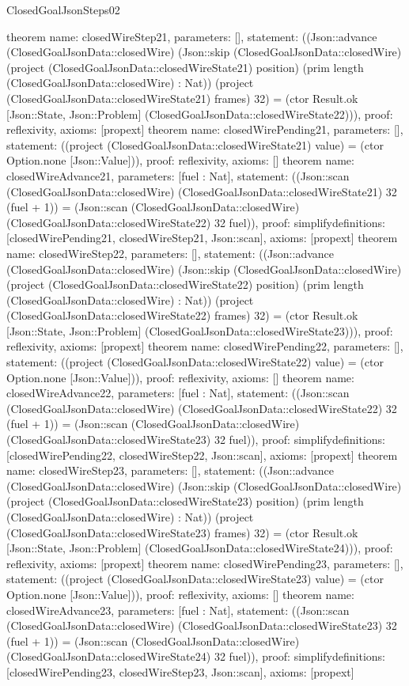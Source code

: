 \begin{lexlean}{ClosedGoalJsonSteps02}
\begin{semanticmodule}
{}
theorem{
 name: closedWireStep21, parameters: [],
 statement: ((Json::advance (ClosedGoalJsonData::closedWire) (Json::skip (ClosedGoalJsonData::closedWire) (project (ClosedGoalJsonData::closedWireState21) position) (prim length (ClosedGoalJsonData::closedWire) : Nat)) (project (ClosedGoalJsonData::closedWireState21) frames) 32) = (ctor Result.ok [Json::State, Json::Problem] (ClosedGoalJsonData::closedWireState22))), proof: reflexivity{}, axioms: [propext]
}
theorem{
 name: closedWirePending21, parameters: [],
 statement: ((project (ClosedGoalJsonData::closedWireState21) value) = (ctor Option.none [Json::Value])), proof: reflexivity{}, axioms: []
}
theorem{
 name: closedWireAdvance21, parameters: [fuel : Nat],
 statement: ((Json::scan (ClosedGoalJsonData::closedWire) (ClosedGoalJsonData::closedWireState21) 32 (fuel + 1)) = (Json::scan (ClosedGoalJsonData::closedWire) (ClosedGoalJsonData::closedWireState22) 32 fuel)), proof: simplify{definitions: [closedWirePending21, closedWireStep21, Json::scan]}, axioms: [propext]
}
theorem{
 name: closedWireStep22, parameters: [],
 statement: ((Json::advance (ClosedGoalJsonData::closedWire) (Json::skip (ClosedGoalJsonData::closedWire) (project (ClosedGoalJsonData::closedWireState22) position) (prim length (ClosedGoalJsonData::closedWire) : Nat)) (project (ClosedGoalJsonData::closedWireState22) frames) 32) = (ctor Result.ok [Json::State, Json::Problem] (ClosedGoalJsonData::closedWireState23))), proof: reflexivity{}, axioms: [propext]
}
theorem{
 name: closedWirePending22, parameters: [],
 statement: ((project (ClosedGoalJsonData::closedWireState22) value) = (ctor Option.none [Json::Value])), proof: reflexivity{}, axioms: []
}
theorem{
 name: closedWireAdvance22, parameters: [fuel : Nat],
 statement: ((Json::scan (ClosedGoalJsonData::closedWire) (ClosedGoalJsonData::closedWireState22) 32 (fuel + 1)) = (Json::scan (ClosedGoalJsonData::closedWire) (ClosedGoalJsonData::closedWireState23) 32 fuel)), proof: simplify{definitions: [closedWirePending22, closedWireStep22, Json::scan]}, axioms: [propext]
}
theorem{
 name: closedWireStep23, parameters: [],
 statement: ((Json::advance (ClosedGoalJsonData::closedWire) (Json::skip (ClosedGoalJsonData::closedWire) (project (ClosedGoalJsonData::closedWireState23) position) (prim length (ClosedGoalJsonData::closedWire) : Nat)) (project (ClosedGoalJsonData::closedWireState23) frames) 32) = (ctor Result.ok [Json::State, Json::Problem] (ClosedGoalJsonData::closedWireState24))), proof: reflexivity{}, axioms: [propext]
}
theorem{
 name: closedWirePending23, parameters: [],
 statement: ((project (ClosedGoalJsonData::closedWireState23) value) = (ctor Option.none [Json::Value])), proof: reflexivity{}, axioms: []
}
theorem{
 name: closedWireAdvance23, parameters: [fuel : Nat],
 statement: ((Json::scan (ClosedGoalJsonData::closedWire) (ClosedGoalJsonData::closedWireState23) 32 (fuel + 1)) = (Json::scan (ClosedGoalJsonData::closedWire) (ClosedGoalJsonData::closedWireState24) 32 fuel)), proof: simplify{definitions: [closedWirePending23, closedWireStep23, Json::scan]}, axioms: [propext]
}
\end{semanticmodule}
\end{lexlean}
